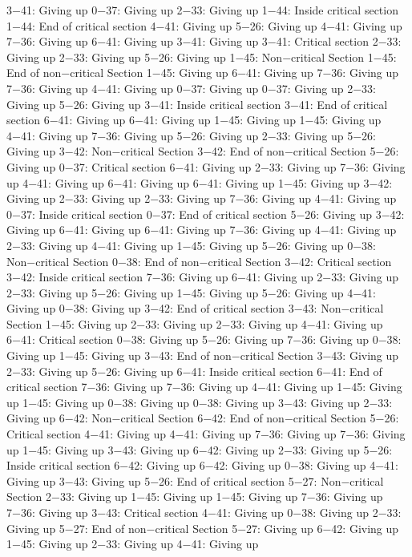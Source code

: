 3−41: Giving up
0−37: Giving up
2−33: Giving up
1−44: Inside critical section
1−44: End of critical section
4−41: Giving up
5−26: Giving up
4−41: Giving up
7−36: Giving up
6−41: Giving up
3−41: Giving up
3−41: Critical section
2−33: Giving up
2−33: Giving up
5−26: Giving up
1−45: Non−critical Section
1−45: End of non−critical Section
1−45: Giving up
6−41: Giving up
7−36: Giving up
7−36: Giving up
4−41: Giving up
0−37: Giving up
0−37: Giving up
2−33: Giving up
5−26: Giving up
3−41: Inside critical section
3−41: End of critical section
6−41: Giving up
6−41: Giving up
1−45: Giving up
1−45: Giving up
4−41: Giving up
7−36: Giving up
5−26: Giving up
2−33: Giving up
5−26: Giving up
3−42: Non−critical Section
3−42: End of non−critical Section
5−26: Giving up
0−37: Critical section
6−41: Giving up
2−33: Giving up
7−36: Giving up
4−41: Giving up
6−41: Giving up
6−41: Giving up
1−45: Giving up
3−42: Giving up
2−33: Giving up
2−33: Giving up
7−36: Giving up
4−41: Giving up
0−37: Inside critical section
0−37: End of critical section
5−26: Giving up
3−42: Giving up
6−41: Giving up
6−41: Giving up
7−36: Giving up
4−41: Giving up
2−33: Giving up
4−41: Giving up
1−45: Giving up
5−26: Giving up
0−38: Non−critical Section
0−38: End of non−critical Section
3−42: Critical section
3−42: Inside critical section
7−36: Giving up
6−41: Giving up
2−33: Giving up
2−33: Giving up
5−26: Giving up
1−45: Giving up
5−26: Giving up
4−41: Giving up
0−38: Giving up
3−42: End of critical section
3−43: Non−critical Section
1−45: Giving up
2−33: Giving up
2−33: Giving up
4−41: Giving up
6−41: Critical section
0−38: Giving up
5−26: Giving up
7−36: Giving up
0−38: Giving up
1−45: Giving up
3−43: End of non−critical Section
3−43: Giving up
2−33: Giving up
5−26: Giving up
6−41: Inside critical section
6−41: End of critical section
7−36: Giving up
7−36: Giving up
4−41: Giving up
1−45: Giving up
1−45: Giving up
0−38: Giving up
0−38: Giving up
3−43: Giving up
2−33: Giving up
6−42: Non−critical Section
6−42: End of non−critical Section
5−26: Critical section
4−41: Giving up
4−41: Giving up
7−36: Giving up
7−36: Giving up
1−45: Giving up
3−43: Giving up
6−42: Giving up
2−33: Giving up
5−26: Inside critical section
6−42: Giving up
6−42: Giving up
0−38: Giving up
4−41: Giving up
3−43: Giving up
5−26: End of critical section
5−27: Non−critical Section
2−33: Giving up
1−45: Giving up
1−45: Giving up
7−36: Giving up
7−36: Giving up
3−43: Critical section
4−41: Giving up
0−38: Giving up
2−33: Giving up
5−27: End of non−critical Section
5−27: Giving up
6−42: Giving up
1−45: Giving up
2−33: Giving up
4−41: Giving up
